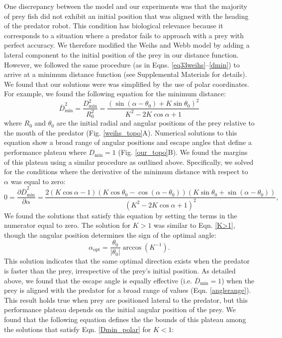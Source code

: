 \documentclass[12pt]{article}
\def\ds{\displaystyle}
\def\d{\partial}
\newcommand{\ol}{\overline}
\begin{document}
One discrepancy between the model and our experiments was that the majority of prey fish did not exhibit an initial position that was aligned with the heading of the predator robot. This condition has biological relevance because it corresponds to a situation where a predator fails to approach with a prey with perfect accuracy. We therefore modified the Weihs and Webb model by adding a lateral component to the initial position of the prey in our distance function. However, we followed the same procedure (as in Eqns. \ref{eq33weihs}--\ref{dmin}) to arrive at a minimum distance function (see Supplemental Materials for details). We found that our solutions were was simplified by the use of polar coordinates. For example, we found the following equation for the minimum distance:
%
\begin{equation}
\ol{D}^2_{\text{min}}= \ds\frac{{D}^2_{\text{min}}}{R_0^2 }=
\ds\frac{\left ( \sin(\alpha - \theta_0) + K \sin \theta_0 \right )^2}{K^2-2 K \cos \alpha +1} 
\label{Dmin_polar}
\end{equation}
%
where $R_0$ and $\theta_0$ are the initial radial and angular positions of the prey relative to the mouth of the predator (Fig. \ref{weihs_topo}A). Numerical solutions to this equation show a broad range of angular positions and escape angles that define a performance plateau where $D_{\text{min}}=1$ (Fig. \ref{our_topo}B). We found the margins of this plateau using a similar procedure as outlined above. Specifically, we solved for the conditions where the derivative of the minimum distance with respect to $\alpha$ was equal to zero:
%
\begin{equation}
0 = \frac{\d \ol{D}^2_{\text{min}}}{\d \alpha} = 
\frac{2(K \cos \alpha - 1)(K\cos \theta_0 - \cos(\alpha - \theta_0))(K\sin \theta_0 + \sin(\alpha -\theta_0))}
{(K^2 - 2K \cos \alpha + 1)^2},
\label{DminDalpha}
\end{equation} 
%
We found the solutions that satisfy this equation by setting the terms in the numerator equal to zero. The solution for $K>1$ was similar to Eqn. \ref{K>1}, though the angular position determines the sign of the optimal angle: 
%
\begin{equation}
\alpha_{\text{opt}} = \frac{\theta_0}{|\theta_0|}  \arccos(K^{-1}).
\label{DminDalpha}
\end{equation} 
%
This solution indicates that the same optimal direction exists when the predator is faster than the prey, irrespective of the prey's initial position. As detailed above, we found that the escape angle is equally effective (i.e. $\ol D_{\text{min}}=1$) when the prey is aligned with the predator for a broad range of values (Eqn. \ref{anglerange}). This result holds true when prey are positioned lateral to the predator, but this performance plateau depends on the initial angular position of the prey. We found that the following equation defines the  the bounds of this plateau among the solutions that satisfy Eqn. \ref{Dmin_polar} for $K<1$:
\end{document}
